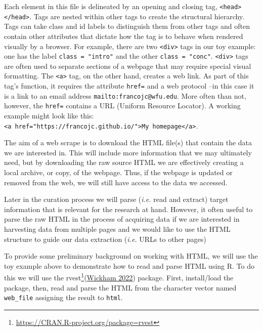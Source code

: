 \documentclass[
  letterpaper,
  DIV=11,
  numbers=noendperiod]{scrreport}
\theoremstyle{definition}
\theoremstyle{remark}
\DeclareRobustCommand{\href}[2]{#2\footnote{\url{#1}}}
\begin{document}
Each element in this file is delineated by an opening and closing tag,
\texttt{\textless{}head\textgreater{}\textless{}/head\textgreater{}}.
Tags are nested within other tags to create the structural hierarchy.
Tags can take class and id labels to distinguish them from other tags
and often contain other attributes that dictate how the tag is to behave
when rendered visually by a browser. For example, there are two
\texttt{\textless{}div\textgreater{}} tags in our toy example: one has
the label \texttt{class\ =\ "intro"} and the other
\texttt{class\ =\ "conc"}. \texttt{\textless{}div\textgreater{}} tags
are often used to separate sections of a webpage that may require
special visual formatting. The \texttt{\textless{}a\textgreater{}} tag,
on the other hand, creates a web link. As part of this tag's function,
it requires the attribute \texttt{href=} and a web protocol --in this
case it is a link to an email address \texttt{mailto:francojc@wfu.edu}.
More often than not, however, the \texttt{href=} contains a URL (Uniform
Resource Locator). A working example might look like this:
\texttt{\textless{}a\ href="https://francojc.github.io/"\textgreater{}My\ homepage\textless{}/a\textgreater{}}.

The aim of a web scrape is to download the HTML file(s) that contain the
data we are interested in. This will include more information that we
may ultimately need, but by downloading the raw source HTML we are
effectively creating a local archive, or copy, of the webpage. Thus, if
the webpage is updated or removed from the web, we will still have
access to the data we accessed.

Later in the curation process we will parse (\emph{i.e.} read and
extract) target information that is relevant for the research at hand.
However, it often useful to parse the raw HTML in the process of
acquiring data if we are interested in harvesting data from multiple
pages and we would like to use the HTML structure to guide our data
extraction (\emph{i.e.} URLs to other pages)

To provide some preliminary background on working with HTML, we will use
the toy example above to demonstrate how to read and parse HTML using R.
To do this we will use the
\href{https://CRAN.R-project.org/package=rvest}{rvest}(\protect\hyperlink{ref-R-rvest}{Wickham
2022}) package. First, install/load the package, then, read and parse
the HTML from the character vector named \texttt{web\_file} assigning
the result to \texttt{html}.
\end{document}
